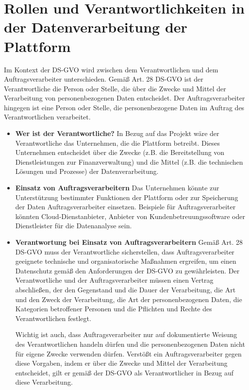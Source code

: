 \chapter{Rollen und Verantwortlichkeiten in der Datenverarbeitung der Plattform}

Im Kontext der DS-GVO wird zwischen dem Verantwortlichen und dem Auftragsverarbeiter unterschieden. Gemäß Art. 28 DS-GVO ist der Verantwortliche die Person oder Stelle, die über die Zwecke und Mittel der Verarbeitung von personenbezogenen Daten entscheidet. Der Auftragsverarbeiter hingegen ist eine Person oder Stelle, die personenbezogene Daten im Auftrag des Verantwortlichen verarbeitet.

\begin{itemize}
    \item \textbf{Wer ist der Verantwortliche?}
    In Bezug auf das Projekt wäre der Verantwortliche das Unternehmen, die die Plattform betreibt. Dieses Unternehmen entscheidet über die Zwecke (z.B. die Bereitstellung von Dienstleistungen zur Finanzverwaltung) und die Mittel (z.B. die technischen Lösungen und Prozesse) der Datenverarbeitung.
    
    \item \textbf{Einsatz von Auftragsverarbeitern}
    Das Unternehmen könnte zur Unterstützung bestimmter Funktionen der Plattform oder zur Speicherung der Daten Auftragsverarbeiter einsetzen. Beispiele für Auftragsverarbeiter könnten Cloud-Dienstanbieter, Anbieter von Kundenbetreuungssoftware oder Dienstleister für die Datenanalyse sein.
    
    \item \textbf{Verantwortung bei Einsatz von Auftragsverarbeitern}
    Gemäß Art. 28 DS-GVO muss der Verantwortliche sicherstellen, dass Auftragsverarbeiter geeignete technische und organisatorische Maßnahmen ergreifen, um einen Datenschutz gemäß den Anforderungen der DS-GVO zu gewährleisten. Der Verantwortliche und der Auftragsverarbeiter müssen einen Vertrag abschließen, der den Gegenstand und die Dauer der Verarbeitung, die Art und den Zweck der Verarbeitung, die Art der personenbezogenen Daten, die Kategorien betroffener Personen und die Pflichten und Rechte des Verantwortlichen festlegt. 
    
    Wichtig ist auch, dass Auftragsverarbeiter nur auf dokumentierte Weisung des Verantwortlichen handeln dürfen und die personenbezogenen Daten nicht für eigene Zwecke verwenden dürfen. Verstößt ein Auftragsverarbeiter gegen diese Vorgaben, indem er über die Zwecke und Mittel der Verarbeitung entscheidet, gilt er gemäß der DS-GVO als Verantwortlicher in Bezug auf diese Verarbeitung. \\
    
\end{itemize}